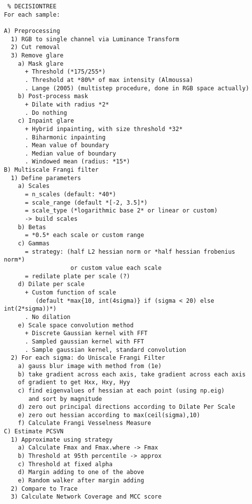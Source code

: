     \begin{spacing}{1}
    \begin{small}
    \begin{verbatim} % DECISIONTREE
For each sample:

A) Preprocessing
  1) RGB to single channel via Luminance Transform
  2) Cut removal
  3) Remove glare
    a) Mask glare
      + Threshold (*175/255*)
      . Threshold at *80%* of max intensity (Almoussa)
      . Lange (2005) (multistep procedure, done in RGB space actually)
    b) Post-process mask
      + Dilate with radius *2*
      . Do nothing
    c) Inpaint glare
      + Hybrid inpainting, with size threshold *32*
      . Biharmonic inpainting
      . Mean value of boundary 
      . Median value of boundary 
      . Windowed mean (radius: *15*)
B) Multiscale Frangi filter
  1) Define parameters
    a) Scales
      = n_scales (default: *40*)
      = scale_range (default *[-2, 3.5]*)
      = scale_type (*logarithmic base 2* or linear or custom)
      -> build scales
    b) Betas
      = *0.5* each scale or custom range
    c) Gammas
      = strategy: (half L2 hessian norm or *half hessian frobenius norm*)
                   or custom value each scale
      = redilate plate per scale (?)
    d) Dilate per scale 
      + Custom function of scale
         (default *max{10, int(4sigma)} if (sigma < 20) else int(2*sigma))*)
      . No dilation
    e) Scale space convolution method
      + Discrete Gaussian kernel with FFT
      . Sampled gaussian kernel with FFT
      . Sample gaussian kernel, standard convolution
  2) For each sigma: do Uniscale Frangi Filter
    a) gauss blur image with method from (1e)
    b) take gradient across each axis, take gradient across each axis
    of gradient to get Hxx, Hxy, Hyy
    c) find eigenvalues of hessian at each point (using np.eig)
       and sort by magnitude 
    d) zero out principal directions according to Dilate Per Scale
    e) zero out hessian according to max(ceil(sigma),10)
    f) Calculate Frangi Vesselness Measure
C) Estimate PCSVN
  1) Approximate using strategy
    a) Calculate Fmax and Fmax.where -> Fmax
    b) Threshold at 95th percentile -> approx
    c) Threshold at fixed alpha
    d) Margin adding to one of the above
    e) Random walker after margin adding
  2) Compare to Trace
  3) Calculate Network Coverage and MCC score
\end{verbatim}
    \end{small}
\end{spacing}

